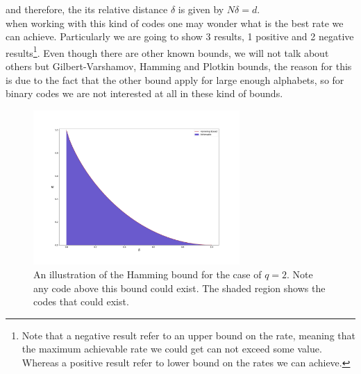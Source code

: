 and therefore, the its relative distance $\delta$ is given by $N\delta=d$.\\
when working with this kind of codes one may wonder what is the best rate we can achieve. Particularly we are going to show 3 results, 1 positive and 2 negative results\footnote{Note that a negative result refer to an upper bound on the rate, meaning that the maximum achievable rate we could get can not exceed some value. Whereas a positive result refer to  lower bound on the rates we can achieve.}. Even though there are other known bounds, we will not talk about others but Gilbert-Varshamov, Hamming and Plotkin bounds, the reason for this is due to the fact that the other bound apply for large enough alphabets, so for binary codes we are not interested at all in these kind of bounds\cite{mackay_information_2003}.\\
\begin{figure}
\centering
\includegraphics[width=0.7\textwidth]{Figures/Hamming_bound.png}
\caption{An illustration of the Hamming bound for the case of $q=2$. Note any code above this bound could exist. The shaded region shows the codes that could exist.  }
\end{figure}
